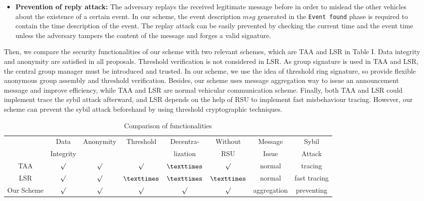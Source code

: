 \documentclass[a4paper]{article}
\begin{document}
\begin{itemize}
  \item \textbf{Prevention of reply attack:} The adversary replays the received legitimate message before in order to mislead the other vehicles about the existence of a certain event. In our scheme, the event description $msg$ generated in the \texttt{Event found} phase is required to contain the time description of the event. The replay attack can be easily prevented by checking the current time and the event time unless the adversary tampers the content of the message and forges a valid signature.
\end{itemize}
Then, we compare the security functionalities of our scheme with two relevant schemes, which are TAA \cite{CNW11} and LSR \cite{Lin13} in Table I. Data integrity and anonymity are satisfied in all proposals. Threshold verification is not considered in LSR. As group signature is used in TAA and LSR, the central group manager must be introduced and trusted. In our scheme, we use the idea of threshold ring signature, so provide flexible anonymous group assembly and threshold verification. Besides, our scheme uses message aggregation way to issue an announcement message and improve efficiency, while TAA and LSR are normal vehicular communication scheme. Finally, both TAA and LSR could implement trace the sybil attack afterward, and LSR depends on the help of RSU to implement fast misbehaviour tracing. However, our scheme can prevent the sybil attack beforehand by using threshold cryptographic techniques.
\begin{table*}
\caption{Comparison of functionalities}
\begin{center}
\scalebox{0.8}
{
\begin{tabular}{c|c c c c c c c}
  \toprule
                         &    Data   & Anonymity &  Threshold   &    Decentra-    &     Without     & Message   &    Sybil   \\
                         & Integrity &           &              &    lization     &      RSU        & Issue    &    Attack  \\
  \midrule
  TAA                    & ${\surd}$ & ${\surd}$ &  ${\surd}$   &  ${\texttimes}$ & ${\surd}$       &  normal   &   tracing  \\
  LSR                    & ${\surd}$ & ${\surd}$ &${\texttimes}$&  ${\texttimes}$ & ${\texttimes}$  &  normal   &   fast tracing  \\
  Our Scheme             & ${\surd}$ & ${\surd}$ &  ${\surd}$   &    ${\surd}$    & ${\surd}$       &aggregation&  preventing\\
  \bottomrule
\end{tabular}
}
\end{center}
\end{table*}
\end{document}
